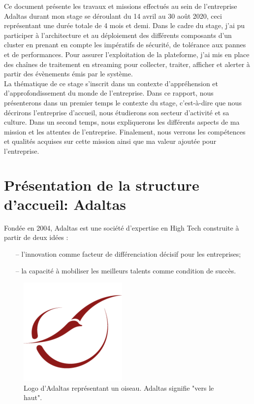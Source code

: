 \documentclass[12pt, french]{report}
\begin{document}
Ce document présente les travaux et missions effectués au sein de l'entreprise Adaltas durant mon stage se déroulant du 14 avril au 30 août 2020, ceci représentant une durée totale de 4 mois et demi. Dans le cadre du stage, j'ai pu participer à l’architecture et au déploiement des différents composants d'un cluster en prenant en compte les impératifs de sécurité, de tolérance aux pannes et de performances. Pour assurer l’exploitation de la plateforme, j'ai mis en place des chaînes de traitement en streaming pour collecter, traiter, afficher et alerter à partir des évènements émis par le système.\\

La thématique de ce stage s’inscrit dans un contexte d’appréhension et d'approfondissement du monde de l’entreprise. Dans ce rapport, nous présenterons dans un premier temps le contexte du stage, c’est-à-dire que nous décrirons l’entreprise d’accueil, nous étudierons son secteur d’activité et sa culture. Dans un second temps, nous expliquerons les différents aspects de ma mission et les attentes de l'entreprise. Finalement, nous verrons les compétences et qualités acquises sur cette mission ainsi que ma valeur ajoutée pour l'entreprise.

\chapter{Présentation de la structure d'accueil: Adaltas}

Fondée en 2004, Adaltas est une société d’expertise en High Tech construite à partir de deux idées :
\begin{itemize}
  \item[--] l’innovation comme facteur de différenciation décisif pour les entreprises;
  \item[--] la capacité à mobiliser les meilleurs talents comme condition de succès.\\
\end{itemize}

\begin{figure}[H]
\includegraphics[scale=0.4]{assets/img/logo-adaltas.png}
\centering
\caption{Logo d'Adaltas représentant un oiseau. Adaltas signifie "vers le haut".}
\label{fig:logo-adaltas}
\end{figure}
\end{document}
